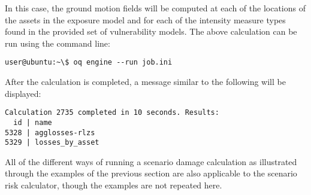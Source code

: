 In this case, the ground motion fields will be computed at each of the
locations of the assets in the exposure model and for each of the intensity
measure types found in the provided set of vulnerability models. The above
calculation can be run using the command line:

\begin{verbatim}
user@ubuntu:~\$ oq engine --run job.ini
\end{verbatim}

After the calculation is completed, a message similar to the following will be
displayed:

\begin{verbatim}
Calculation 2735 completed in 10 seconds. Results:
  id | name
5328 | agglosses-rlzs
5329 | losses_by_asset
\end{verbatim}

All of the different ways of running a scenario damage calculation as
illustrated through the examples of the previous section are also applicable
to the scenario risk calculator, though the examples are not repeated here.